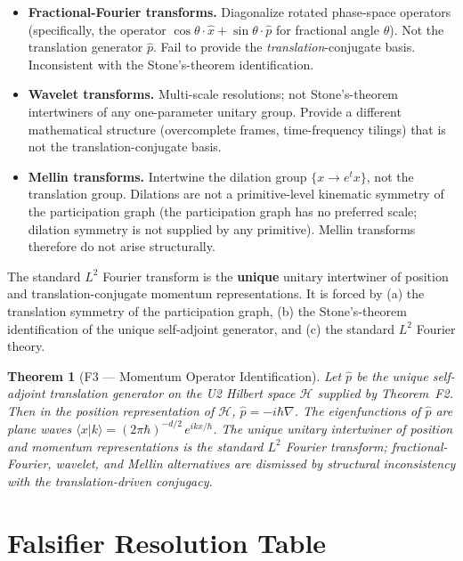 \documentclass[11pt,a4paper]{article}
\newtheorem{theorem}{Theorem}[section]
\begin{document}
\begin{itemize}
  \item \textbf{Fractional-Fourier transforms.} Diagonalize rotated phase-space operators (specifically, the operator $\cos\theta \cdot \hat{x} + \sin\theta \cdot \hat{p}$ for fractional angle $\theta$). Not the translation generator $\hat{p}$. Fail to provide the \emph{translation}-conjugate basis. Inconsistent with the Stone's-theorem identification.
  \item \textbf{Wavelet transforms.} Multi-scale resolutions; not Stone's-theorem intertwiners of any one-parameter unitary group. Provide a different mathematical structure (overcomplete frames, time-frequency tilings) that is not the translation-conjugate basis.
  \item \textbf{Mellin transforms.} Intertwine the dilation group $\{x \to e^t x\}$, not the translation group. Dilations are not a primitive-level kinematic symmetry of the participation graph (the participation graph has no preferred scale; dilation symmetry is not supplied by any primitive). Mellin transforms therefore do not arise structurally.
\end{itemize}

The standard $L^2$ Fourier transform is the \textbf{unique} unitary intertwiner of position and translation-conjugate momentum representations. It is forced by (a) the translation symmetry of the participation graph, (b) the Stone's-theorem identification of the unique self-adjoint generator, and (c) the standard $L^2$ Fourier theory.

\begin{theorem}[F3 --- Momentum Operator Identification]
Let $\hat{p}$ be the unique self-adjoint translation generator on the U2 Hilbert space $\mathcal{H}$ supplied by Theorem~F2. Then in the position representation of $\mathcal{H}$, $\hat{p} = -i\hbar\nabla$. The eigenfunctions of $\hat{p}$ are plane waves $\langle x | k \rangle = (2\pi\hbar)^{-d/2} \, e^{ikx/\hbar}$. The unique unitary intertwiner of position and momentum representations is the standard $L^2$ Fourier transform; fractional-Fourier, wavelet, and Mellin alternatives are dismissed by structural inconsistency with the translation-driven conjugacy.
\end{theorem}

\section{Falsifier Resolution Table}\label{sec:falsifier-table}
\end{document}
